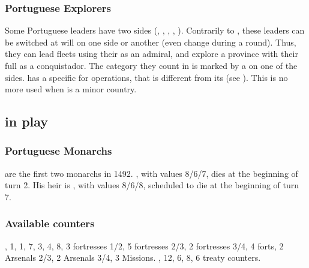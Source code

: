 \subsubsection{Portuguese Explorers}
\aparag Some Portuguese leaders have two sides (,
, , ,
).
\bparag\label{chSpecific:Portugal:Explorers} Contrarily to
, these leaders can be switched
at will on one side or another (even change during a round). Thus, they
can lead fleets using their \Man as an admiral, and explore a province
with their full \Man as a conquistador.
\bparag The category they count in is marked by a {\textetoile} on one
of the sides.
 \POR has a specific \FTI for \ROTW
operations, that is different from its \FTI (see
).
\bparag This \FTI is no more used when \POR is a minor country.


\subsection{ in play}
\subsubsection{Portuguese Monarchs}
 are the
first two monarchs in 1492. , with values 8/6/7, dies
at the beginning of turn 2. His heir is , with values
8/6/8, scheduled to die at the beginning of turn 7.
\subsubsection{Available counters}
\ARMY, 1\FLEET, 1\corsaire, 7\LDND, 3\LD, 4\NTD,
8\LDENDE, 3 fortresses 1/2, 5 fortresses 2/3, 2 fortresses 3/4, 4 forts,
2 Arsenals 2/3, 2 Arsenals 3/4, 3 Missions.
\COL, 12\TP, 6\MNU, 8\TradeFLEET, 6 \ROTW treaty
counters.

